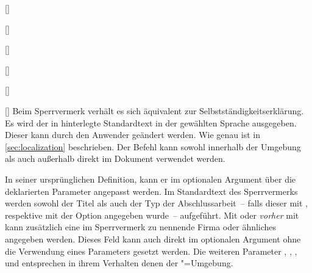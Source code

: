 \begin{Declaration}[v2.02]{}
\begin{Declaration}{[]}
\begin{Declaration}{[]}
\begin{Declaration}[v2.02]{%
  []%
}
\begin{Declaration}[v2.02]{[]}
\begin{Declaration}[v2.02]{[]}
\begin{Declaration}{[\PSet]}
\printdeclarationlist%
%
%
Beim Sperrvermerk verhält es sich äquivalent zur Selbstständigkeitserklärung.
Es wird der in  hinterlegte Standardtext in der gewählten 
Sprache ausgegeben. Dieser kann durch den Anwender geändert werden. Wie genau 
ist in \autoref{sec:localization} beschrieben. Der Befehl  
kann sowohl innerhalb der Umgebung  als auch 
außerhalb direkt im Dokument verwendet werden. 

In seiner ursprünglichen Definition, kann er im optionalen Argument über die 
deklarierten Parameter angepasst werden. Im Standardtext des Sperrvermerks 
werden sowohl der Titel als auch der Typ der Abschlussarbeit~-- falls dieser 
mit ,  respektive  
mit der Option  angegeben wurde~-- aufgeführt. Mit 
 oder \emph{vorher} mit  kann 
zusätzlich eine im Sperrvermerk zu nennende Firma oder ähnliches angegeben 
werden. Dieses Feld kann auch direkt im optionalen Argument ohne die Verwendung 
eines Parameters gesetzt werden. Die weiteren Parameter 
, 
, 
, 
 und 
 entsprechen in ihrem Verhalten denen 
der "=Umgebung.
\end{Declaration}
\end{Declaration}
\end{Declaration}
\end{Declaration}
\end{Declaration}
\end{Declaration}
\end{Declaration}

